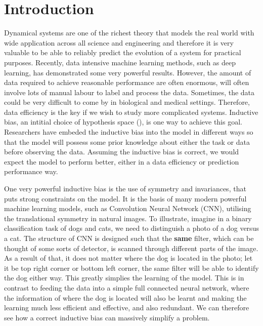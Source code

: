 \documentclass{statsmsc}
\begin{document}

\mainmatter
\tableofcontents

\chapter{Introduction}
Dynamical systems are one of the richest theory that models the real world with wide application across all science and engineering and therefore it is very valuable to be able to reliably predict the evolution of a system for practical purposes.
Recently, data intensive machine learning methods, such as deep learning, has demonstrated some very powerful results. 
However, the amount of data required to achieve reasonable performance are often enormous, will often involve lots of manual labour to label and process the data.
Sometimes, the data could be very difficult to come by in biological and medical settings.
Therefore, data efficiency is the key if we wish to study more complicated systems.
Inductive bias, an intitial choice of hypothesis space (\cite{Baxter2000}), is one way to achieve this goal.
Researchers have embeded the inductive bias into the model in different ways so that the model will possess some prior knowledge about either the task or data before observing the data.
Assuming the inductive bias is correct, we would expect the model to perform better, either in a data efficiency or prediction performance way.

One very powerful inductive bias is the use of symmetry and invariances, that puts strong constraints on the model. 
It is the basis of many modern powerful machine learning models, such as Convolution Neural Network (CNN), utilising the translational symmetry in natural images.
To illustrate, imagine in a binary classification task of dogs and cats, we need to distinguish a photo of a dog versus a cat. 
The structure of CNN is designed such that the \textbf{same} filter, which can be thought of some sorts of detector, is scanned through different parts of the image.  
As a result of that, it does not matter where the dog is located in the photo; let it be top right corner or bottom left corner, the same filter will be able to identify the dog either way.
This greatly simplies the learning of the model.
This is in contrast to feeding the data into a simple full connected neural network, where the information of where the dog is located will also be learnt and making the learning much less efficient and effective, and also redundant.
We can therefore see how a correct inductive bias can massively simplify a problem.
\end{document}
